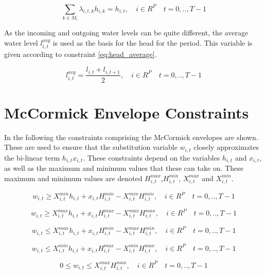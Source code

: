 \begin{equation}
\label{eq:sum_lambda_head}
    \sum_{k \in M_{i}}  \lambda_{i,t,k} h_{i,k} = h_{i,t}, \quad  i\in R^{P} \quad t=0,..,T-1
\end{equation}

As the incoming and outgoing water levels can be quite different, the average water level $l^{avg}_{i,t}$ is used as the basis for the head for the period. This variable is given according to constraint \eqref{eq:head_average}.

\begin{equation}
\label{eq:head_average}
  l^{avg}_{i,t} = \dfrac{l_{i,t}+l_{i,t+1}}{2},   \quad  i\in R^P \quad t=0,..,T-1
\end{equation}




\section{McCormick Envelope Constraints}
\label{Appendix: McCormick constraints}
In the following the constraints comprising the McCormick envelopes are shown. These are used to ensure that the substitution variable $w_{i,t}$ closely approximates the bi-linear term $h_{i,t}x_{i,t}$. These constraints depend on the variables $h_{i,t}$ and $x_{i,t}$, as well as the maximum and minimum values that these can take on. These maximum and minimum values are denoted $H_{i,t}^{max}$,$H_{i,t}^{min}$, $X_{i,t}^{max}$ and $X_{i,t}^{min}$. 

\begin{equation}
\label{eq:McCormick_Underest_1}
    w_{i,t} \geq X_{i,t}^{min}h_{i,t} + x_{i,t}H_{i,t}^{min} - X_{i,t}^{min}H_{i,t}^{min}, \quad  i\in R^{P} \quad t=0,..,T-1
\end{equation}

\begin{equation}
\label{eq:McCormick_Underest_2}
    w_{i,t} \geq X_{i,t}^{max}h_{i,t} + x_{i,t}H_{i,t}^{max} - X_{i,t}^{max}H_{i,t}^{max}, \quad  i\in R^{P} \quad t=0,..,T-1
\end{equation}

\begin{equation}
\label{eq:McCormick_Overest_1}
    w_{i,t} \leq X_{i,t}^{max}h_{i,t} + x_{i,t}H_{i,t}^{min} - X_{i,t}^{max}H_{i,t}^{min},  \quad  i\in R^{P} \quad t=0,..,T-1
\end{equation}

\begin{equation}
\label{eq:McCormick_Overest_2}
    w_{i,t} \leq X_{i,t}^{min}h_{i,t} + x_{i,t}H_{i,t}^{max}  - X_{i,t}^{min}H_{i,t}^{max}, \quad  i\in R^{P} \quad t=0,..,T-1
\end{equation}

\begin{equation}
\label{eq:McCormick_bounds}
    0 \leq w_{i,t} \leq  X_{i,t}^{max}H_{i,t}^{max}, \quad  i\in R^{P} \quad t=0,..,T-1
\end{equation}